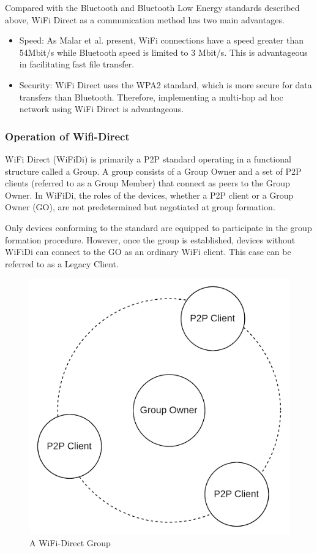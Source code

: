 Compared with the Bluetooth and Bluetooth Low Energy standards described above,
WiFi Direct as a communication method has two main advantages.

\begin{itemize}
    \item Speed: As Malar et al. present, WiFi connections have a speed greater
          than 54Mbit/s while Bluetooth speed is limited to 3 Mbit/s. This is
          advantageous in facilitating fast file transfer.

    \item Security: WiFi Direct uses the WPA2 standard, which is more secure
          for data transfers than Bluetooth.
          Therefore, implementing a multi-hop ad hoc network using WiFi Direct
          is
          advantageous.

\end{itemize}

\vspace{0.3cm}

\subsubsection{Operation of Wifi-Direct}
WiFi Direct (WiFiDi) is primarily a P2P standard operating in a functional
structure called a Group. A group consists of a Group Owner and a set of P2P
clients (referred to as a Group Member) that connect as peers to the Group
Owner. In WiFiDi, the roles of the devices, whether a P2P client or a Group
Owner (GO), are not predetermined but negotiated at group formation.

Only devices conforming to the standard are equipped to participate in the
group formation procedure. However, once the group is established, devices
without WiFiDi can connect to the GO as an ordinary WiFi
client\cite{funai2015}\cite{wifidispec}. This case can be referred to as a
Legacy Client.

\begin{figure}[htbp]
    \centerline{\includegraphics[height=0.45\textwidth]{imgs/group.png}}
    \caption{A WiFi-Direct Group}
    \label{digroup}
\end{figure}

